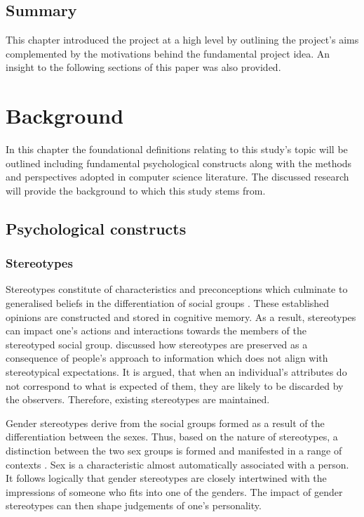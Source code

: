 \documentclass{l4proj}
\begin{document}
\section{Summary}

This chapter introduced the project at a high level by outlining the project’s aims complemented by the motivations behind the fundamental project idea. An insight to the following sections of this paper was also provided.


\chapter{Background}\label{chap:background}

In this chapter the foundational definitions relating to this study’s topic will be outlined including fundamental psychological constructs along with the methods and perspectives adopted in computer science literature. The discussed research will provide the background to which this study stems from.

\section{Psychological constructs}\label{sec:background_psychology}
\subsection{Stereotypes}
Stereotypes constitute of characteristics and preconceptions which culminate to generalised beliefs in the differentiation of social groups \citep{wyer1984handbook}. These established opinions are constructed and stored in cognitive memory. As a result, stereotypes can impact one’s actions and interactions towards the members of the stereotyped social group.
\citet{Wigboldus2003} discussed how stereotypes are preserved as a consequence of people’s approach to information which does not align with stereotypical expectations. It is argued, that when an individual’s attributes do not correspond to what is expected of them, they are likely to be discarded by the observers. Therefore, existing stereotypes are maintained.

Gender stereotypes derive from the social groups formed as a result of the differentiation between the sexes. Thus, based on the nature of stereotypes, a distinction between the two sex groups is formed and manifested in a range of contexts \citep{ Ellemers2017}.
Sex is a characteristic almost automatically associated with a person. It follows logically that gender stereotypes are closely intertwined with the impressions of someone who fits into one of the genders. The impact of gender stereotypes can then shape judgements of one’s personality.
\end{document}
